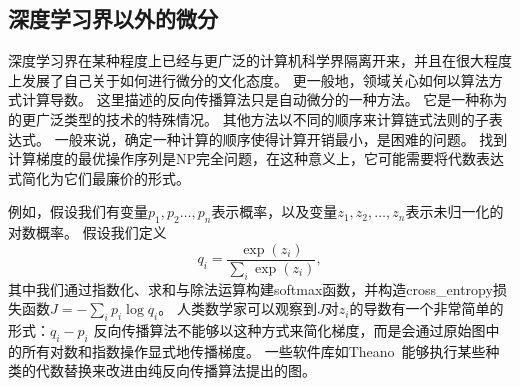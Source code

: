   
\subsection{深度学习界以外的微分}
\label{sec:differentiation_outside_the_deep_learning_community}

深度学习界在某种程度上已经与更广泛的计算机科学界隔离开来，并且在很大程度上发展了自己关于如何进行微分的文化态度。
更一般地，领域关心如何以算法方式计算导数。 
这里描述的反向传播算法只是自动微分的一种方法。 
它是一种称为的更广泛类型的技术的特殊情况。 
其他方法以不同的顺序来计算链式法则的子表达式。 
一般来说，确定一种计算的顺序使得计算开销最小，是困难的问题。 
找到计算梯度的最优操作序列是NP完全问题\citep{naumann2008optimal}，在这种意义上，它可能需要将代数表达式简化为它们最廉价的形式。

例如，假设我们有变量$p_1,p_2\ldots,p_n$表示概率，以及变量$z_1,z_2,\ldots,z_n$表示未归一化的对数概率。
假设我们定义
\begin{equation}
  q_i = \frac{\exp(z_i)}{\sum_i \exp(z_i)},
\end{equation}
其中我们通过指数化、求和与除法运算构建softmax函数，并构造\gls{cross_entropy}损失函数$J=-\sum_i p_i\log q_i$。
人类数学家可以观察到$J$对$z_i$的导数有一个非常简单的形式：$q_i-p_i$
反向传播算法不能够以这种方式来简化梯度，而是会通过原始图中的所有对数和指数操作显式地传播梯度。
一些软件库如Theano~\citep{bergstra+al:2010-scipy-small,Bastien-Theano-2012}能够执行某些种类的代数替换来改进由纯反向传播算法提出的图。
  
  
